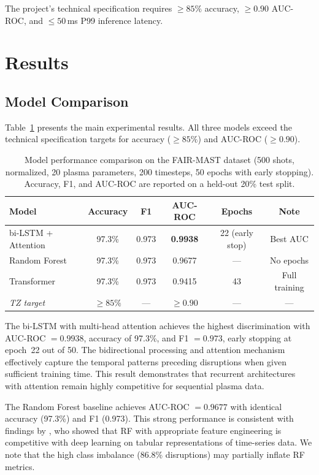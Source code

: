 \documentclass[twocolumn]{article}
\begin{document}
The project's technical specification requires
$\geq 85\%$ accuracy, $\geq 0.90$ AUC-ROC, and
$\leq 50$\,ms P99 inference latency.


\section{Results}
\label{sec:results}

\subsection{Model Comparison}

Table~\ref{tab:results} presents the main experimental results.
All three models exceed the technical specification targets
for accuracy ($\geq 85\%$) and AUC-ROC ($\geq 0.90$).

\begin{table}[t]
\centering
\caption{Model performance comparison on the FAIR-MAST dataset
  (500 shots, normalized, 20 plasma parameters, 200 timesteps, 50 epochs with early stopping).
  Accuracy, F1, and AUC-ROC are reported on a held-out 20\% test split.}
\label{tab:results}
\begin{tabular}{@{}lccccc@{}}
\toprule
\textbf{Model} &
\textbf{Accuracy} &
\textbf{F1} &
\textbf{AUC-ROC} &
\textbf{Epochs} &
\textbf{Note} \\
\midrule
bi-LSTM + Attention
  & 97.3\% & 0.973 & \textbf{0.9938} & 22 (early stop) & Best AUC \\
Random Forest
  & 97.3\% & 0.973 & 0.9677 & --- & No epochs \\
Transformer
  & 97.3\% & 0.973 & 0.9415 & 43 & Full training \\
\midrule
\textit{TZ target}
  & $\geq 85\%$ & --- & $\geq 0.90$ & --- & --- \\
\bottomrule
\end{tabular}
\end{table}

The bi-LSTM with multi-head attention achieves the highest
discrimination with AUC-ROC $= 0.9938$, accuracy of 97.3\%,
and F1 $= 0.973$, early stopping at epoch~22 out of 50.
The bidirectional processing and attention mechanism effectively
capture the temporal patterns preceding disruptions when given
sufficient training time.
This result demonstrates that recurrent architectures with
attention remain highly competitive for sequential plasma data.

The Random Forest baseline achieves AUC-ROC $= 0.9677$ with
identical accuracy (97.3\%) and F1 (0.973).
This strong performance is consistent with findings by \citet{rea2018},
who showed that RF with appropriate feature engineering
is competitive with deep learning on tabular representations
of time-series data.
We note that the high class imbalance (86.8\% disruptions)
may partially inflate RF metrics.
\end{document}
